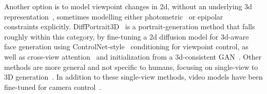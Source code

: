 Another option is to model viewpoint changes in 2d, without an underlying 3d representation~\cite{zero1to3}, sometimes modelling either photometric~\cite{iNVS} or epipolar~\cite{huang2024epidiff} constraints explicitly.
DiffPortrait3D~\cite{gu2024diffportrait3d} is a portrait-generation method that falls roughly within this category, by fine-tuning a 2d diffusion model for 3d-aware face generation using ControlNet-style~\cite{zhang2023adding} conditioning for viewpoint control, as well as cross-view attention~\cite{guo2023animatediff} and initialization from a 3d-consistent GAN~\cite{EG3D}.
Other methods are more general and not specific to humans, focusing on single-view to 3D generation~\cite{zero1to3,NeuralLift-360,sargent2023zeronvs,seo2024genwarp,Make-It-3D,shen2023anything3d,gao2024cat3d}. In addition to these single-view methods, video models have been fine-tuned for camera control~\cite{he2024cameractrl,wang2024motionctrl}.
